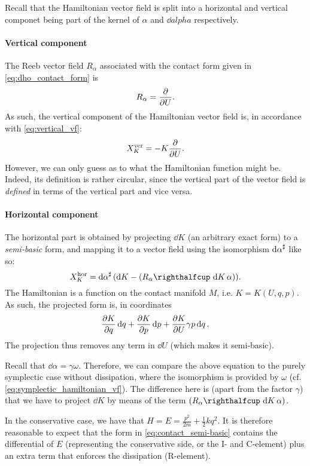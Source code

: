 Recall that the Hamiltonian vector field is split into a horizontal and vertical componet being part of the kernel of $\alpha$ and $\dd{alpha}$ respectively.

\paragraph{Vertical component} The Reeb vector field $R_\alpha$ associated with the contact form given in \cref{eq:dho_contact_form} is 
$$ R_\alpha = \pdv{}{U}. $$
As such, the vertical component of the Hamiltonian vector field is, in accordance with \cref{eq:vertical_vf}:
\begin{equation}
    X_K^\text{ver} = -K\pdv{}{U}.
    \label{eq:dho_vertical}
\end{equation}
However, we can only guess as to what the Hamiltonian function might be. Indeed, its definition is rather circular, since the vertical part of the vector field is \emph{defined} in terms of the vertical part and vice versa.

\paragraph{Horizontal component} The horizontal part is obtained by projecting $\dd{K}$ (an arbitrary exact form) to a \emph{semi-basic} form, and mapping it to a vector field using the isomorphism $\dd{\alpha}^\sharp$ like so:
$$ X_K^\text{hor} = \fromDual{\dd{\alpha}}(\dd{K} - \qty(\intpr{R_\alpha}{\dd{K}}\alpha)). $$
The Hamiltonian is a function on the contact manifold $M$, i.e. $K = K(U, q, p)$. As such, the projected form is, in coordinates
\begin{equation}
    \pdv{K}{q}\dd{q} + \pdv{K}{p}\dd{p} + \pdv{K}{U} \gamma p \dd{q}.
    \label{eq:contact_semi-basic}
\end{equation}
The projection thus removes any term in $\dd{U}$ (which makes it semi-basic).

Recall that $\dd{\alpha} = \gamma \omega $. Therefore, we can compare the above equation to the purely symplectic case without dissipation, where the isomorphism is provided by $\omega$ (cf. \cref{eq:symplectic_hamiltonian_vf}). The difference here is (apart from the factor $\gamma$) that we have to project $\dd{K}$ by means of the term $\qty(\intpr{R_\alpha}{\dd{K}}\alpha)$.

In the conservative case, we have that $H = E = \frac{p^2}{2m} + \frac{1}{2}kq^2$. It is therefore reasonable to expect that the form in \cref{eq:contact_semi-basic} contains the differential of $E$ (representing the conservative side, or the I- and C-element) plus an extra term that enforces the dissipation (R-element). 

